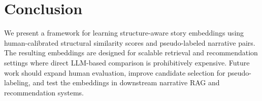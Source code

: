 \section{Conclusion}

We present a framework for learning structure-aware story embeddings using human-calibrated structural similarity scores and pseudo-labeled narrative pairs. The resulting embeddings are designed for scalable retrieval and recommendation settings where direct LLM-based comparison is prohibitively expensive. Future work should expand human evaluation, improve candidate selection for pseudo-labeling, and test the embeddings in downstream narrative RAG and recommendation systems.
